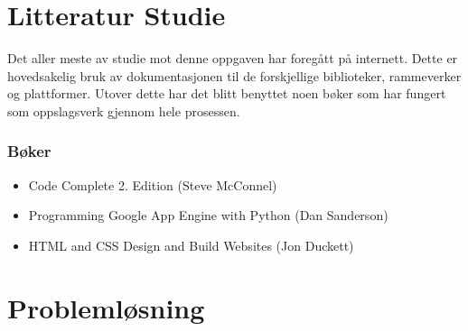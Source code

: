 \section{Litteratur Studie}
Det aller meste av studie mot denne oppgaven har foregått på internett. Dette er hovedsakelig bruk av dokumentasjonen til de forskjellige biblioteker, rammeverker og plattformer. Utover dette har det blitt benyttet noen bøker som har fungert som oppslagsverk gjennom hele prosessen.

\subsubsection*{Bøker}
\begin{itemize}
\item Code Complete 2. Edition (Steve McConnel)
\item Programming Google App Engine with Python (Dan Sanderson)
\item HTML and CSS Design and Build Websites (Jon Duckett)
\end{itemize}


\section{Problemløsning}

